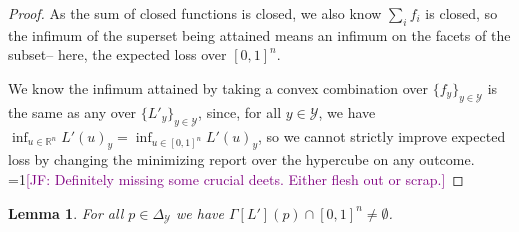 \documentclass[12pt]{article}
\newcommand{\Comments}{1}
\newcommand{\mynote}[2]{\ifnum\Comments=1\textcolor{#1}{#2}\fi}
\newcommand{\jessie}[1]{\mynote{purple}{[JF: #1]}}
\newcommand{\reals}{\mathbb{R}}
\newcommand{\prop}[1]{\Gamma[#1]}
\newcommand{\simplex}{\Delta_\Y}
\newcommand{\Y}{\mathcal{Y}}
\newtheorem{lemma}{Lemma}
\begin{document}
\begin{proof}
  As the sum of closed functions is closed, we also know $\sum_i f_i$ is closed, so the infimum of the superset being attained means an infimum on the facets of the subset-- here, the expected loss over $[0,1]^n$.
	
  We know the infimum attained by taking a convex combination over $\{f_y\}_{y \in \Y}$ is the same as any over $\{L'_y\}_{y \in \Y}$, since, for all $y \in \Y$, we have $\inf_{u \in \reals^n} L'(u)_y = \inf_{u \in [0,1]^n} L'(u)_y$, so we cannot strictly improve expected loss by changing the minimizing report over the hypercube on any outcome.
  \jessie{Definitely missing some crucial deets.  Either flesh out or scrap.}
\end{proof}

\begin{lemma}\label{lem:top-k-optimal-hypercube}
	For all $p \in \simplex$ we have $\prop{L'}(p) \cap [0,1]^n \neq \emptyset$.
\end{lemma}
\end{document}
